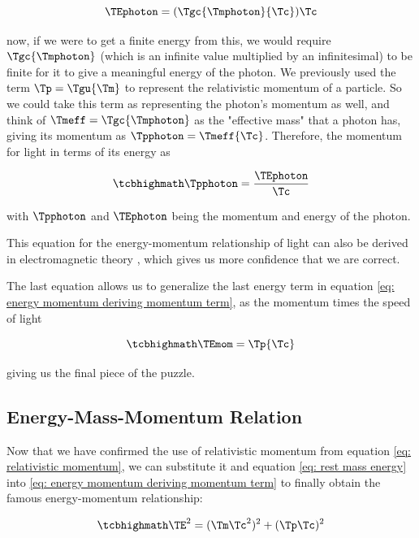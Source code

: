 \begin{equation}
	\TEphoton  = (\Tgc {\Tmphoton  }{\Tc }){\Tc }
\end{equation}

now, if we were to get a finite energy from this, we would require $\Tgc {\Tmphoton }$ (which is an infinite value multiplied by an infinitesimal) to be finite for it to give a meaningful energy of the photon.
We previously used the term $\Tp =\Tgu {\Tm }$ to represent the relativistic momentum of a particle.
So we could take this term as representing the photon's momentum as well, and think of $\Tmeff =\Tgc {\Tmphoton  }$ as the "effective mass" that a photon has, giving its momentum as $\Tpphoton =\Tmeff {\Tc }$.
Therefore, the momentum for light in terms of its energy as

\begin{equation}
	\mhl{
	 {\Tpphoton  }= \frac{\TEphoton  }{\Tc }
	}
\end{equation}

with $\Tpphoton $ and $\TEphoton $ being the momentum and energy of the photon.

This equation for the energy-momentum relationship of light can also be derived in electromagnetic theory \cite{FeynmanMomentum}, which gives us more confidence that we are correct.

The last equation allows us to generalize the last energy term in equation \eqref{eq: energy momentum deriving momentum term}, as the momentum times the speed of light

\begin{equation}
	\label{eq: energy from momentum}
	\mhl{
		\TEmom  = \Tp  {\Tc }
	}
\end{equation}

giving us the final piece of the puzzle.

\subsection{Energy-Mass-Momentum Relation}\label{subsect: Energy-Mass-Momentum Relation}

Now that we have confirmed the use of relativistic momentum from equation \eqref{eq: relativistic momentum}, we can substitute it and equation \eqref{eq: rest mass energy} into \eqref{eq: energy momentum deriving momentum term} to finally obtain the famous energy-momentum relationship:

\begin{equation}
	\label{eq: energy-momentum relation}
	\mhl{
			\TE ^2  = (\Tm \Tc ^2)^2 + (\Tp \Tc )^2
	}
\end{equation}

